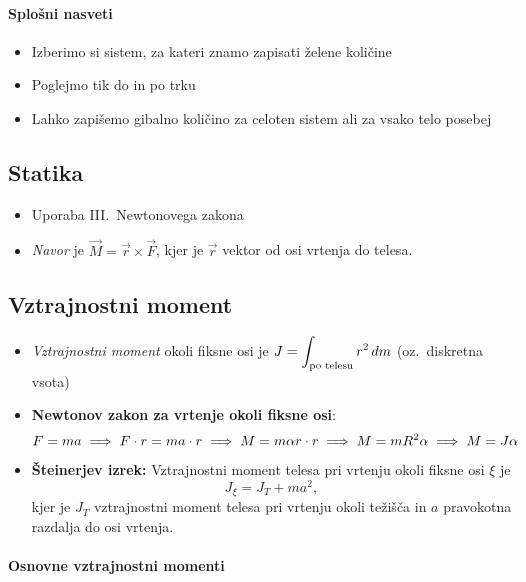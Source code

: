 \paragraph{Splošni nasveti}
\begin{itemize}
    \item Izberimo si sistem, za kateri znamo zapisati želene količine
    \item Poglejmo tik do in po trku
    \item Lahko zapišemo gibalno količino za celoten sistem ali za vsako telo posebej
\end{itemize}

\subsection{Statika}
\begin{itemize}
    \item Uporaba III.\ Newtonovega zakona
    \item \emph{Navor} je \(\vec{M} = \vec{r} \times \vec{F}\), kjer je \(\vec{r}\) vektor od osi vrtenja do telesa.
\end{itemize}

\subsection{Vztrajnostni moment}
\begin{itemize}
    \item \emph{Vztrajnostni moment} okoli fiksne osi je \(\displaystyle J = \int_{\text{po telesu}} r^2 \, dm\) (oz.\ diskretna vsota)
    \item \textbf{Newtonov zakon za vrtenje okoli fiksne osi}: \[F = ma \implies F \cdot r = ma \cdot r \implies M = m \alpha r \cdot r \implies M = mR^2 \alpha \implies M = J\alpha\]
    \item \textbf{Šteinerjev izrek:} Vztrajnostni moment telesa pri vrtenju okoli fiksne osi \(\xi\) je \[J_\xi = J_T + ma^2,\]
    kjer je \(J_T\) vztrajnostni moment telesa pri vrtenju okoli težišča in \(a\) pravokotna razdalja do osi vrtenja.
\end{itemize}

\paragraph{Osnovne vztrajnostni momenti} \ 

